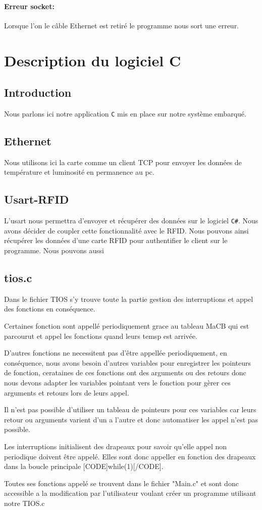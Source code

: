 \documentclass[12pt,a4paper]{report}
\begin{document}
			\paragraph{Erreur socket:} Lorsque l'on le câble Ethernet est retiré le programme nous sort une erreur.
	
	\section{Description du logiciel C} 
		\subsection{Introduction}
		Nous parlons ici notre application \verb+C+ mis en place sur notre système embarqué. 
		\subsection{Ethernet}
		Nous utilisons ici la carte comme un client TCP pour envoyer les données de température et luminosité en permanence au pc. 
		\subsection{Usart-RFID}
		L'usart nous permettra d'envoyer et récupérer des données sur le logiciel \verb+C#+. Nous avons décider de coupler cette fonctionnalité avec le RFID. Nous pouvons ainsi récupérer les données d'une carte RFID pour authentifier le client sur le programme. Nous pouvons aussi 
		\subsection{tios.c}
		Dans le fichier TIOS s'y trouve toute la partie gestion des interruptions et appel des fonctions en conséquence.
 
Certaines fonction sont appellé periodiquement grace au tableau MaCB qui est parcourut et appel les fonctions quand leurs temsp est arrivée.
 
D'autres fonctions ne necessitent pas d'être appellée periodiquement, en conséquence, nous avons besoin d'autres variables pour enregistrer les pointeurs de fonction, cerataines de ces fonctions
ont des arguments ou des retours donc nous devons adapter les variables pointant vers le fonction pour gèrer ces arguments et retours lors de leurs appel.
 
Il n'est pas possible d'utiliser un tableau de pointeurs pour ces variables car leurs retour ou arguments varient d'un a l'autre et donc automatiser les appel n'est pas possible.
 
Les interruptions initialisent des drapeaux pour savoir qu'elle appel non periodique doivent être appelé. Elles sont donc appeller en fonction des drapeaux dans la boucle principale [CODE]while(1)[/CODE].
 
Toutes ses fonctions appelé se trouvent dans le fichier "Main.c" et sont donc accessible a la modification par l'utilisateur voulant créer un programme utilisant notre TIOS.c
	
\end{document}
